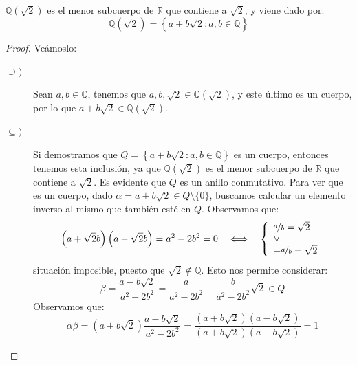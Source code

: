\begin{ejemplo}
    $\mathbb{Q}\left(\sqrt{2}\right)$ es el menor subcuerpo de $\mathbb{R}$ que contiene a $\sqrt{2}$, y viene dado por:
    \begin{equation*}
        \mathbb{Q}\left(\sqrt{2}\right) = \left\{a+b\sqrt{2} : a,b\in \mathbb{Q}\right\}
    \end{equation*}
    \begin{proof}
        Veámoslo:
        \begin{description}
            \item [$\supseteq)$] Sean $a,b\in \mathbb{Q}$, tenemos que $a,b,\sqrt{2}\in \mathbb{Q}\left(\sqrt{2}\right)$, y este último es un cuerpo, por lo que $a+b\sqrt{2}\in \mathbb{Q}\left(\sqrt{2}\right)$.
            \item [$\subseteq)$] Si demostramos que $Q=\left\{a+b\sqrt{2}:a,b\in \mathbb{Q}\right\}$ es un cuerpo, entonces tenemos esta inclusión, ya que $\mathbb{Q}\left(\sqrt{2}\right)$ es el menor subcuerpo de $\mathbb{R}$ que contiene a $\sqrt{2}$. Es evidente que $Q$ es un anillo conmutativo. Para ver que es un cuerpo, dado $\alpha=a+b\sqrt{2}\in Q\setminus\{0\}$, buscamos calcular un elemento inverso al mismo que también esté en $Q$. Observamos que:
                \begin{equation*}
                    \left(a+\sqrt{2}b\right)\left(a-\sqrt{2}b\right) = a^2-2b^2 = 0 \quad \Longleftrightarrow\quad  \left\{\begin{array}{l}
                        \nicefrac{a}{b} = \sqrt{2} \\
                        \lor \\
                        -\nicefrac{a}{b} = \sqrt{2}
                    \end{array}\right.
                \end{equation*}
                situación imposible, puesto que $\sqrt{2}\notin \mathbb{Q}$. Esto nos permite considerar:
                \begin{equation*}
                \beta =\dfrac{a-b\sqrt{2}}{a^2-2b^2} = \dfrac{a}{a^2-2b^2} - \dfrac{b}{a^2-2b^2}\sqrt{2}  \in Q
                \end{equation*}
                Observamos que:
                \begin{equation*}
                    \alpha \beta = \left(a+b\sqrt{2}\right) \dfrac{a-b\sqrt{2}}{a^2-2b^2} = \dfrac{\left(a+b\sqrt{2}\right)\left(a-b\sqrt{2}\right)}{\left(a+b\sqrt{2}\right)\left(a-b\sqrt{2}\right)} = 1
                \end{equation*}

\end{description}
\end{proof}
\end{ejemplo}
